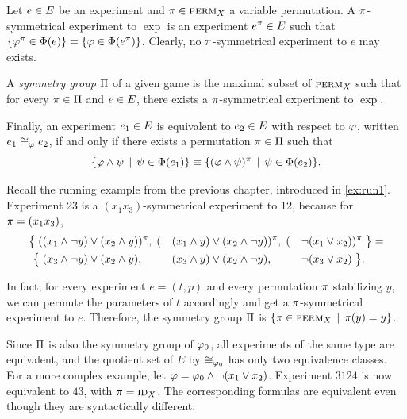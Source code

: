 \begin{definition} \label{def:expeq}
Let $e\in E$ be an experiment and $\pi\in\textsc{perm}_X$ a variable permutation.
A $\pi$-symmetrical experiment to $\exp$ is an experiment
  $e^\pi\in E$
  such that
  $\{\varphi^\pi \in\Phi(e)\} = \{\varphi\in\Phi(e^\pi)\}$.
Clearly, no $\pi$-symmetrical experiment to $e$ may exists.

A \emph{symmetry group} $\Pi$ of a given game is
  the maximal subset of $\textsc{perm}_X$ such that for
  every $\pi\in\Pi$ and $e\in E$,
  there exists a $\pi$-symmetrical experiment to $\exp$.

Finally, an experiment $e_1\in E$ is equivalent to $e_2\in E$ with respect to $\varphi$,
  written $e_1\cong_{\varphi}e_2$,
  if and only if there exists a permutation $\pi\in\Pi$ such that
 \[ \{ \varphi\wedge\psi \:\:|\:\: \psi\in\Phi(e_1) \} \equiv
   \{ (\varphi\wedge\psi)^\pi \:\:|\:\: \psi\in\Phi(e_2) \}. \]
\end{definition}

\begin{example}
Recall the running example from the previous chapter, introduced in \autoref{ex:run1}.
Experiment 23 is a $(x_1x_3)$-symmetrical experiment to 12, because for $\pi = (x_1x_3)$,
\begin{alignat*}{5}
\big\{ \;(&(x_1 \wedge \neg y) \vee (x_2\wedge y))^\pi,\;
   (&&(x_1 \wedge y) \vee (x_2\wedge\neg y))^\pi,\;
   (&&\neg (x_1  \vee x_2))^\pi \;\big\} = \\
\big\{ \;&(x_3 \wedge \neg y) \vee (x_2\wedge y),
   &&(x_3 \wedge y) \vee (x_2\wedge\neg y),
   &&\neg (x_3 \vee x_2)\; \big\}.
\end{alignat*}

In fact, for every experiment $e = (t, p)$ and every permutation $\pi$ stabilizing $y$,
  we can permute the parameters of $t$ accordingly and get a $\pi$-symmetrical experiment to $e$.
Therefore, the symmetry group $\Pi$ is $\{\pi\in\textsc{perm}_X \:\:|\:\: \pi(y) = y\}$.

Since $\Pi$ is also the symmetry group of $\varphi_0$,
  all experiments of the same type are equivalent,
  and the quotient set of $E$ by $\cong_{\varphi_0}$
  has only two equivalence classes.
For a more complex example, let $\varphi = \varphi_0\wedge\neg(x_1\vee x_2)$.
Experiment $3124$ is now equivalent to $43$, with $\pi = \textsc{id}_X$.
The corresponding formulas are equivalent even though they
  are syntactically different. \eqed
\end{example}


